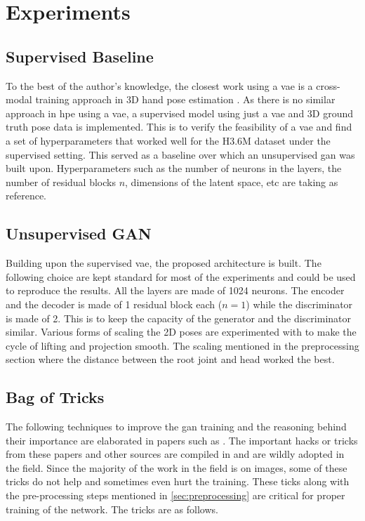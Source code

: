 \chapter{Experiments}
\label{chap:experiments}


\section{Supervised Baseline}
To the best of the author's knowledge, the closest work using a \ac{vae} is a cross-modal training approach in 3D hand pose estimation \cite{crossmodal}. As there is no similar approach in \ac{hpe} using a \ac{vae}, a supervised model using just a \ac{vae} and 3D ground truth pose data is implemented. This is to verify the feasibility of a \ac{vae} and find a set of hyperparameters that worked well for the H3.6M dataset under the supervised setting. This served as a baseline over which an unsupervised \ac{gan} was built upon. Hyperparameters such as the number of neurons in the layers, the number of residual blocks $n$, dimensions of the latent space, etc are taking as reference.

\section{Unsupervised GAN}
Building upon the supervised \ac{vae}, the proposed architecture is built. The following choice are kept standard for most of the experiments and could be used to reproduce the results. All the layers are made of 1024 neurons. The encoder and the decoder is made of 1 residual block each ($n = 1$) while the discriminator is made of 2. This is to keep the capacity of the generator and the discriminator similar. Various forms of scaling the 2D poses are experimented with to make the cycle of lifting and projection smooth. The scaling mentioned in the preprocessing section where the distance between the root joint and head worked the best. %

\section{Bag of Tricks}
The following techniques to improve the \ac{gan} training and the reasoning behind their importance are elaborated in papers such as \cite{soumith2017wasserstein,goodfellow2014generative,openaigan2wgan,improved_gan}. The important hacks or tricks from these papers and other sources are compiled in \cite{gan_hacks} and are wildly adopted in the field. Since the majority of the work in the field is on images, some of these tricks do not help and sometimes even hurt the training. These ticks along with the pre-processing steps mentioned in \ref{sec:preprocessing} are critical for proper training of the network. The tricks are as follows. %
 
